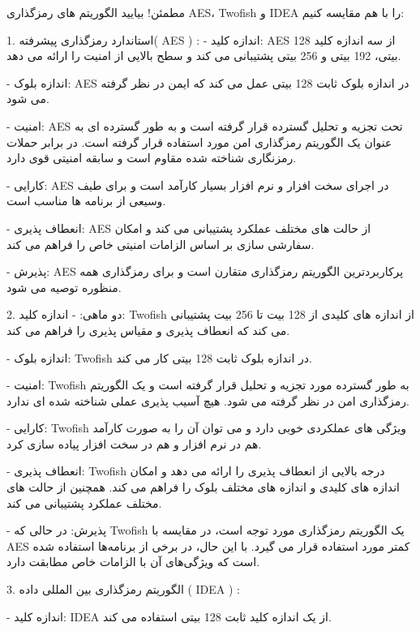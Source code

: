 \begin{boxB}
    مطمئن! بیایید الگوریتم های رمزگذاری AES، Twofish و IDEA را با هم مقایسه کنیم:
    
1. استاندارد رمزگذاری پیشرفته( AES ) :
    - اندازه کلید: AES از سه اندازه کلید 128 بیتی، 192 بیتی و 256 بیتی پشتیبانی می کند و سطح بالایی از امنیت را ارائه می دهد.
   
    - اندازه بلوک: AES در اندازه بلوک ثابت 128 بیتی عمل می کند که ایمن در نظر گرفته می شود.
   
    - امنیت: AES تحت تجزیه و تحلیل گسترده قرار گرفته است و به طور گسترده ای به عنوان یک الگوریتم رمزگذاری امن مورد استفاده قرار گرفته است. در برابر حملات رمزنگاری شناخته شده مقاوم است و سابقه امنیتی قوی دارد.
    
    - کارایی: AES در اجرای سخت افزار و نرم افزار بسیار کارآمد است و برای طیف وسیعی از برنامه ها مناسب است.
    
    - انعطاف پذیری: AES از حالت های مختلف عملکرد پشتیبانی می کند و امکان سفارشی سازی بر اساس الزامات امنیتی خاص را فراهم می کند.
    
    - پذیرش: AES پرکاربردترین الگوریتم رمزگذاری متقارن است و برای رمزگذاری همه منظوره توصیه می شود.


2. دو ماهی:
    - اندازه کلید: Twofish از اندازه های کلیدی از 128 بیت تا 256 بیت پشتیبانی می کند که انعطاف پذیری و مقیاس پذیری را فراهم می کند.
    
    - اندازه بلوک: Twofish در اندازه بلوک ثابت 128 بیتی کار می کند.
   
    - امنیت: Twofish به طور گسترده مورد تجزیه و تحلیل قرار گرفته است و یک الگوریتم رمزگذاری امن در نظر گرفته می شود. هیچ آسیب پذیری عملی شناخته شده ای ندارد.
    
    - کارایی: Twofish ویژگی های عملکردی خوبی دارد و می توان آن را به صورت کارآمد هم در نرم افزار و هم در سخت افزار پیاده سازی کرد.
    
    - انعطاف پذیری: Twofish درجه بالایی از انعطاف پذیری را ارائه می دهد و امکان اندازه های کلیدی و اندازه های مختلف بلوک را فراهم می کند. همچنین از حالت های مختلف عملکرد پشتیبانی می کند.
    
    - پذیرش: در حالی که Twofish یک الگوریتم رمزگذاری مورد توجه است، در مقایسه با AES کمتر مورد استفاده قرار می گیرد. با این حال، در برخی از برنامه‌ها استفاده شده است که ویژگی‌های آن با الزامات خاص مطابقت دارد.

3. الگوریتم رمزگذاری بین المللی داده ( IDEA ) :
    
    - اندازه کلید: IDEA از یک اندازه کلید ثابت 128 بیتی استفاده می کند.
    

\end{boxB}
